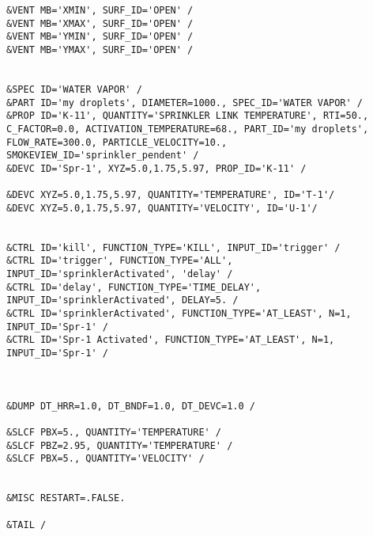 \begin{lstlisting}[emptylines=0, basicstyle=\tiny]
&VENT MB='XMIN', SURF_ID='OPEN' /  
&VENT MB='XMAX', SURF_ID='OPEN' /  
&VENT MB='YMIN', SURF_ID='OPEN' /  
&VENT MB='YMAX', SURF_ID='OPEN' / 

 
&SPEC ID='WATER VAPOR' /
&PART ID='my droplets', DIAMETER=1000., SPEC_ID='WATER VAPOR' /
&PROP ID='K-11', QUANTITY='SPRINKLER LINK TEMPERATURE', RTI=50., C_FACTOR=0.0, ACTIVATION_TEMPERATURE=68., PART_ID='my droplets', FLOW_RATE=300.0, PARTICLE_VELOCITY=10., SMOKEVIEW_ID='sprinkler_pendent' /
&DEVC ID='Spr-1', XYZ=5.0,1.75,5.97, PROP_ID='K-11' /

&DEVC XYZ=5.0,1.75,5.97, QUANTITY='TEMPERATURE', ID='T-1'/
&DEVC XYZ=5.0,1.75,5.97, QUANTITY='VELOCITY', ID='U-1'/


&CTRL ID='kill', FUNCTION_TYPE='KILL', INPUT_ID='trigger' /
&CTRL ID='trigger', FUNCTION_TYPE='ALL', INPUT_ID='sprinklerActivated', 'delay' /
&CTRL ID='delay', FUNCTION_TYPE='TIME_DELAY', INPUT_ID='sprinklerActivated', DELAY=5. /
&CTRL ID='sprinklerActivated', FUNCTION_TYPE='AT_LEAST', N=1, INPUT_ID='Spr-1' /
&CTRL ID='Spr-1 Activated', FUNCTION_TYPE='AT_LEAST', N=1, INPUT_ID='Spr-1' /



&DUMP DT_HRR=1.0, DT_BNDF=1.0, DT_DEVC=1.0 /

&SLCF PBX=5., QUANTITY='TEMPERATURE' /
&SLCF PBZ=2.95, QUANTITY='TEMPERATURE' /
&SLCF PBX=5., QUANTITY='VELOCITY' /


&MISC RESTART=.FALSE.

&TAIL /


\end{lstlisting}